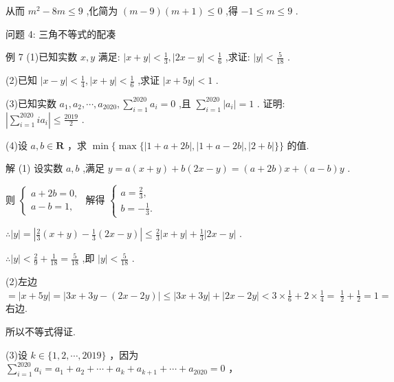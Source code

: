 \documentclass[10pt]{article}
\begin{document}
从而 \({m}^{2} - {8m} \leq  9\) ,化简为 \(\left( {m - 9}\right) \left( {m + 1}\right)  \leq  0\) ,得 \(- 1 \leq  m \leq  9\) .

问题 4: 三角不等式的配凑

例 7 (1)已知实数 \(x,y\) 满足: \(\left| {x + y}\right|  < \frac{1}{3},\left| {{2x} - y}\right|  < \frac{1}{6}\) ,求证: \(\left| y\right|  < \frac{5}{18}\) .

(2)已知 \(\left| {x - y}\right|  < \frac{1}{4},\left| {x + y}\right|  < \frac{1}{6}\) ,求证 \(\left| {x + {5y}}\right|  < 1\) .

(3)已知实数 \({a}_{1},{a}_{2},\cdots ,{a}_{2020},\mathop{\sum }\limits_{{i = 1}}^{{2020}}{a}_{i} = 0\) ,且 \(\mathop{\sum }\limits_{{i = 1}}^{{2020}}\left| {a}_{i}\right|  = 1\) . 证明: \(\left| {\mathop{\sum }\limits_{{i = 1}}^{{2020}}i{a}_{i}}\right|  \leq  \frac{2019}{2}\) .

(4)设 \(a,b \in  \mathbf{R}\) ，求 \(\min \{ \max \{ \left| {1 + a + {2b}}\right| ,\left| {1 + a - {2b}}\right| ,\left| {2 + b}\right| \} \}\) 的值.

解 (1) 设实数 \(a,b\) ,满足 \(y = a\left( {x + y}\right)  + b\left( {{2x} - y}\right)  = \left( {a + {2b}}\right) x + \left( {a - b}\right) y\) .

则 \(\left\{  \begin{array}{l} a + {2b} = 0, \\  a - b = 1, \end{array}\right.\) 解得 \(\left\{  \begin{array}{l} a = \frac{2}{3}, \\  b =  - \frac{1}{3}. \end{array}\right.\)

\(\therefore \left| y\right|  = \left| {\frac{2}{3}\left( {x + y}\right)  - \frac{1}{3}\left( {{2x} - y}\right) }\right|  \leq  \frac{2}{3}\left| {x + y}\right|  + \frac{1}{3}\left| {{2x} - y}\right|\) .

\(\therefore \left| y\right|  < \frac{2}{9} + \frac{1}{18} = \frac{5}{18}\) ,即 \(\left| y\right|  < \frac{5}{18}\) .

(2)左边 \(= \left| {x + {5y}}\right|  = \left| {{3x} + {3y} - \left( {{2x} - {2y}}\right) }\right|  \leq  \left| {{3x} + {3y}}\right|  + \left| {{2x} - {2y}}\right|  < 3 \times  \frac{1}{6} + 2 \times  \frac{1}{4} = \; \frac{1}{2} + \frac{1}{2} = 1 =\) 右边.

所以不等式得证.

(3)设 \(k \in  \{ 1,2,\cdots ,{2019}\}\) ，因为 \(\mathop{\sum }\limits_{{i = 1}}^{{2020}}{a}_{i} = {a}_{1} + {a}_{2} + \cdots  + {a}_{k} + {a}_{k + 1} + \cdots  + {a}_{2020} = 0\) ，
\end{document}
